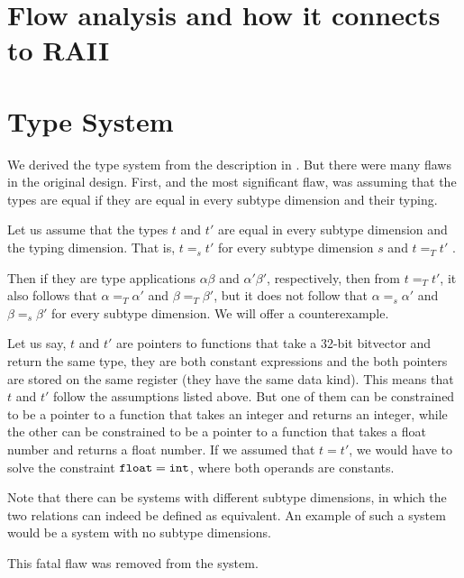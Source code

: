 \section{Flow analysis and how it connects to RAII}

\section{Type System}

We derived the type system from the description in . But there were many flaws in the original design. First, and the most significant flaw, was assuming that the types are equal if they are equal in every subtype dimension and their typing.

\begin{ex}
    Let us assume that the types $t$ and $t'$ are equal in every subtype dimension and the typing dimension. That is, $t =_s t'$ for every subtype dimension $s$ and $t =_T t'$ .

    Then if they are type applications $\alpha \beta$ and $\alpha' \beta'$, respectively, then from $t =_T t'$, it also follows that $\alpha =_T \alpha'$ and $\beta =_T \beta'$, but it does not follow that $\alpha =_s \alpha'$ and $\beta =_s \beta'$ for every subtype dimension. We will offer a counterexample.

    Let us say, $t$ and $t'$ are pointers to functions that take a 32-bit bitvector and return the same type, they are both constant expressions and the both pointers are stored on the same register (they have the same data kind). This means that $t$ and $t'$ follow the assumptions listed above. But one of them can be constrained to be a pointer to a function that takes an integer and returns an integer, while the other can be constrained to be a pointer to a function that takes a float number and returns a float number. If we assumed that $t = t'$, we would have to solve the constraint $\mathtt{float} = \mathtt{int}$, where both operands are constants.

    Note that there can be systems with different subtype dimensions, in which the two relations can indeed be defined as equivalent. An example of such a system would be a system with no subtype dimensions.
\end{ex}

This fatal flaw was removed from the system.

